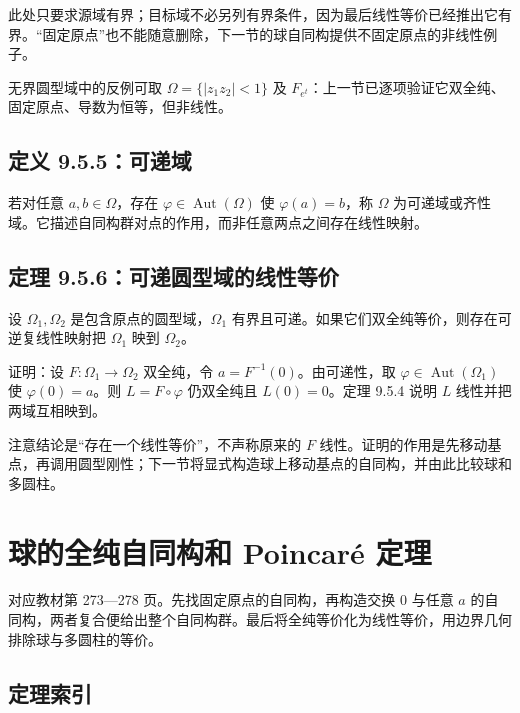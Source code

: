 \documentclass[11pt,a4paper]{article}
\begin{document}
此处只要求源域有界；目标域不必另列有界条件，因为最后线性等价已经推出它有界。``固定原点''也不能随意删除，下一节的球自同构提供不固定原点的非线性例子。

无界圆型域中的反例可取 \(\Omega=\{|z_1z_2|<1\}\) 及
\(F_{e^t}\)：上一节已逐项验证它双全纯、固定原点、导数为恒等，但非线性。

\subsection{定义 9.5.5：可递域}\label{ch09-s5-heading-6}

若对任意 \(a,b\in\Omega\)，存在 \(\varphi\in\operatorname{Aut}(\Omega)\)
使 \(\varphi(a)=b\)，称 \(\Omega\)
为可递域或齐性域。它描述自同构群对点的作用，而非任意两点之间存在线性映射。

\subsection{定理 9.5.6：可递圆型域的线性等价}\label{ch09-s5-heading-7}

设 \(\Omega_1,\Omega_2\) 是包含原点的圆型域，\(\Omega_1\)
有界且可递。如果它们双全纯等价，则存在可逆复线性映射把 \(\Omega_1\) 映到
\(\Omega_2\)。

证明：设 \(F:\Omega_1\to\Omega_2\) 双全纯，令
\(a=F^{-1}(0)\)。由可递性，取 \(\varphi\in\operatorname{Aut}(\Omega_1)\)
使 \(\varphi(0)=a\)。则 \(L=F\circ\varphi\) 仍双全纯且 \(L(0)=0\)。定理
9.5.4 说明 \(L\) 线性并把两域互相映到。

注意结论是``存在一个线性等价''，不声称原来的 \(F\)
线性。证明的作用是先移动基点，再调用圆型刚性；下一节将显式构造球上移动基点的自同构，并由此比较球和多圆柱。

\section{球的全纯自同构和 Poincaré 定理}
\hypertarget{chapter9-part-6}{}
\par
对应教材第 273---278 页。先找固定原点的自同构，再构造交换 \(0\) 与任意
\(a\)
的自同构，两者复合便给出整个自同构群。最后将全纯等价化为线性等价，用边界几何排除球与多圆柱的等价。

\subsection*{定理索引}\label{ch09-s6-heading-1}
\end{document}
